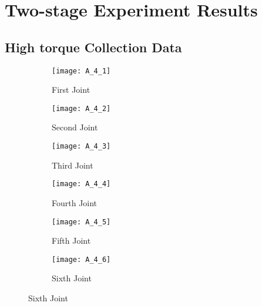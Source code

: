 \section*{Two-stage Experiment Results}
\subsection*{High torque Collection Data}
\begin{figure}[H]
  \caption{Denso torque during high torque experiment}
  \begin{subfigure}[t]{0.5\textwidth}
    \centering
    \texttt{[image: A\_4\_1]} 
    \caption{First Joint}
  \end{subfigure}
  \begin{subfigure}[t]{0.5\textwidth}
    \centering
    \texttt{[image: A\_4\_2]}
    \caption{Second Joint}
  \end{subfigure}
  \begin{subfigure}[t]{0.5\textwidth}
    \centering
    \texttt{[image: A\_4\_3]}
    \caption{Third Joint}
  \end{subfigure}
  \begin{subfigure}[t]{0.5\textwidth}
    \centering
    \texttt{[image: A\_4\_4]}
    \caption{Fourth Joint}
  \end{subfigure}
  \begin{subfigure}[t]{0.5\textwidth}
    \centering
    \texttt{[image: A\_4\_5]}
    \caption{Fifth Joint}
  \end{subfigure}
  \begin{subfigure}[t]{0.5\textwidth}
    \centering
    \texttt{[image: A\_4\_6]}
    \caption{Sixth Joint}
  \end{subfigure}
\end{figure}


